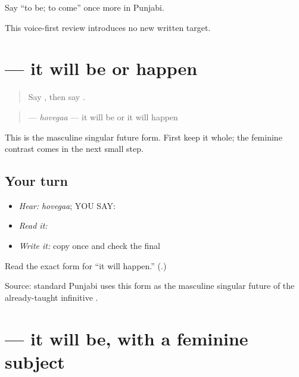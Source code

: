 \begin{tcolorbox}[breakable,colback=teal!4,colframe=teal!35!black,title={Before you move on}]
Say “to be; to come” once more in Punjabi.

This voice-first review introduces no new written target.
\end{tcolorbox}
\section[\texorpdfstring{\pa{ਹੋਵੇਗਾ} (hovegaa)}{ਹੋਵੇਗਾ (hovegaa)}]{ — it will be or happen}

\label{lesson:PA-C186-hovega}



\begin{quote}
Say \textbf{}, then say \textbf{}.
\end{quote}

\begin{grammarlens}[title={Grammar Lens: the masculine singular future}]
\begin{quote}
\textbf{} — \emph{hovegaa} — it will be or it will happen
\end{quote}

This is the masculine singular future form. First keep it whole; the feminine contrast comes in the next small step.
\end{grammarlens}

\subsection*{Your turn}
\begin{itemize}
\raggedright
  \item \emph{Hear:} \emph{hovegaa}; YOU SAY: \textbf{}
  \item \emph{Read it:} \textbf{ }
  \item \emph{Write it:} copy \textbf{} once and check the final \textbf{}
\end{itemize}

\begin{tcolorbox}[breakable,colback=teal!4,colframe=teal!35!black,title={Before you move on}]
Read the exact form for “it will happen.” (\textbf{}.)

Source: standard Punjabi uses this form as the masculine singular future of the already-taught infinitive \textbf{}.
\end{tcolorbox}
\section[\texorpdfstring{\pa{ਹੋਵੇਗੀ} (hovegii)}{ਹੋਵੇਗੀ (hovegii)}]{ — it will be, with a feminine subject}

